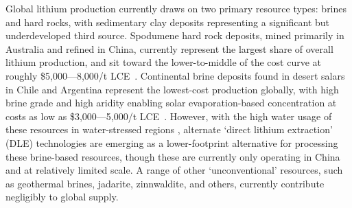 Global lithium production currently draws on two primary resource types: brines and hard rocks, with sedimentary clay deposits representing a significant but underdeveloped third source. Spodumene hard rock deposits, mined primarily in Australia and refined in China, currently represent the largest share of overall lithium production, and sit toward the lower-to-middle of the cost curve at roughly \$5,000---8,000/t LCE~\cite{flemingLongrunAvailabilityMineral2024, wesselkaemperOptimizationProcessingCosts2025}. Continental brine deposits found in desert salars in Chile and Argentina represent the lowest-cost production globally, with high brine grade and high aridity enabling solar evaporation-based concentration at costs as low as \$3,000---5,000/t LCE~\cite{flemingLongrunAvailabilityMineral2024}. However, with the high water usage of these resources in water-stressed regions \cite{sunRobustAssessmentsLithium2025, halkesLifeCycleAssessment2024}, alternate `direct lithium extraction' (DLE) technologies are emerging as a lower-footprint alternative for processing these brine-based resources, though these are currently only operating in China and at relatively limited scale. A range of other `unconventional' resources, such as geothermal brines, jadarite, zinnwaldite, and others, currently contribute negligibly to global supply. 

